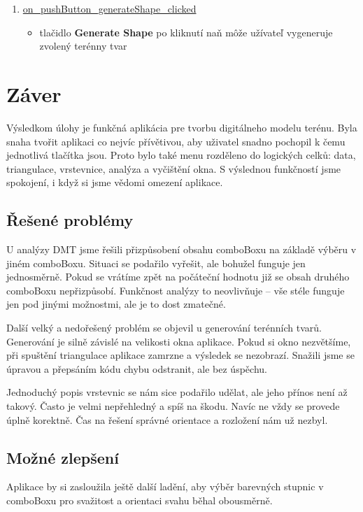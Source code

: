 \documentclass[12pt]{article}
\begin{document}
\begin{enumerate}
\item[] \underline{on\_pushButton\_generateShape\_clicked}
\begin{itemize}
\item tlačidlo \textbf{Generate Shape} po kliknutí naň môže užívateľ vygeneruje zvolený terénny tvar
\end{itemize}



\end{enumerate}


\clearpage
\section{Záver}
Výsledkom úlohy je funkčná aplikácia pre tvorbu digitálneho modelu terénu. Byla snaha tvořit aplikaci co nejvíc přívětivou, aby uživatel snadno pochopil k čemu jednotlivá tlačítka jsou. Proto bylo také menu rozděleno do logických celků: data, triangulace, vrstevnice, analýza a vyčištění okna. S výslednou funkčností jsme spokojení, i když si jsme vědomi omezení aplikace.

\subsection{Řešené problémy}
U analýzy DMT jsme řešili přizpůsobení obsahu comboBoxu na základě výběru v jiném comboBoxu. Situaci se podařilo vyřešit, ale bohužel funguje jen jednosměrně. Pokud se vrátíme zpět na počáteční hodnotu již se obsah druhého comboBoxu nepřizpůsobí. Funkčnost analýzy to neovlivňuje -- vše stéle funguje jen pod jinými možnostmi, ale je to dost zmatečné.

Další velký a nedořešený problém se objevil u generování terénních tvarů. Generování je silně závislé na velikosti okna aplikace. Pokud si okno nezvětšíme, při spuštění triangulace aplikace zamrzne a výsledek se nezobrazí. Snažili jsme se úpravou a přepsáním kódu chybu odstranit, ale bez úspěchu.

Jednoduchý popis vrstevnic se nám sice podařilo udělat, ale jeho přínos není až takový. Často je velmi nepřehledný a spíš na škodu. Navíc ne vždy se provede úplně korektně. Čas na řešení správné orientace a rozložení nám už nezbyl.

\subsection{Možné zlepšení}
Aplikace by si zasloužila ještě další ladění, aby výběr barevných stupnic v comboBoxu pro svažitost a orientaci svahu běhal obousměrně. 
\end{document}
